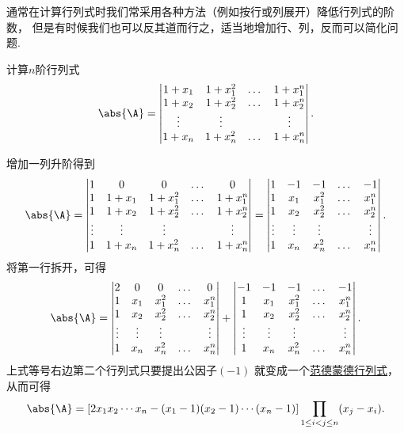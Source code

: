 通常在计算行列式时我们常采用各种方法（例如按行或列展开）降低行列式的阶数，
但是有时候我们也可以反其道而行之，适当地增加行、列，反而可以简化问题.
\begin{example}
计算\(n\)阶行列式\[
	\abs{\A} = \begin{vmatrix}
		1 + x_1 & 1 + x_1^2 & \dots & 1 + x_1^n \\
		1 + x_2 & 1 + x_2^2 & \dots & 1 + x_2^n \\
		\vdots & \vdots & & \vdots \\
		1 + x_n & 1 + x_n^2 & \dots & 1 + x_n^n
	\end{vmatrix}.
\]
\begin{solution}
增加一列升阶得到\[
	\abs{\A} = \begin{vmatrix}
		1 & 0 & 0 & \dots & 0 \\
		1 & 1 + x_1 & 1 + x_1^2 & \dots & 1 + x_1^n \\
		1 & 1 + x_2 & 1 + x_2^2 & \dots & 1 + x_2^n \\
		\vdots & \vdots & \vdots & & \vdots \\
		1 & 1 + x_n & 1 + x_n^2 & \dots & 1 + x_n^n
	\end{vmatrix}
	= \begin{vmatrix}
		1 & -1 & -1 & \dots & -1 \\
		1 & x_1 & x_1^2 & \dots & x_1^n \\
		1 & x_2 & x_2^2 & \dots & x_2^n \\
		\vdots & \vdots & \vdots & & \vdots \\
		1 & x_n & x_n^2 & \dots & x_n^n
	\end{vmatrix}.
\]
将第一行拆开，可得\[
	\abs{\A} = \begin{vmatrix}
		2 & 0 & 0 & \dots & 0 \\
		1 & x_1 & x_1^2 & \dots & x_1^n \\
		1 & x_2 & x_2^2 & \dots & x_2^n \\
		\vdots & \vdots & \vdots & & \vdots \\
		1 & x_n & x_n^2 & \dots & x_n^n
	\end{vmatrix}
	+ \begin{vmatrix}
		-1 & -1 & -1 & \dots & -1 \\
		1 & x_1 & x_1^2 & \dots & x_1^n \\
		1 & x_2 & x_2^2 & \dots & x_2^n \\
		\vdots & \vdots & \vdots & & \vdots \\
		1 & x_n & x_n^2 & \dots & x_n^n
	\end{vmatrix}.
\]
上式等号右边第二个行列式只要提出公因子\((-1)\)
就变成一个\hyperref[equation:行列式.范德蒙德行列式]{范德蒙德行列式}，
从而可得\[
	\abs{\A}
	= \left[ 2 x_1 x_2 \dotsm x_n - (x_1 - 1)(x_2 - 1)\dotsm(x_n - 1) \right]
	\prod_{1 \leq i < j \leq n} (x_j - x_i).
\]
\end{solution}
\end{example}


